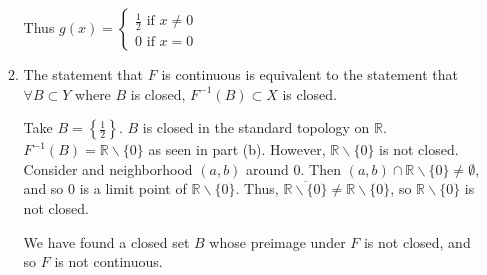 \documentclass{article}
\newcommand{\R}{\mathbb{R}}
\newcommand{\sk}{\smallskip}
\begin{document}
\begin{enumerate}
\begin{enumerate}
        \sk 

        Thus $g(x) = \begin{cases}
            \frac{1}{2} \text{ if } x \neq 0 \\
            0 \text{ if } x = 0
        \end{cases}$

        \item The statement that $F$ is continuous is equivalent to the statement that $\forall B \subset Y$ where $B$ is closed, $F^{-1}(B) \subset X$ is closed. 

        \sk 

        Take $B = \left\{\frac{1}{2}\right\}$. $B$ is closed in the standard topology on $\R$. $F^{-1}(B) = \R\backslash\{0\}$ as seen in part (b). However, $\R\backslash\{0\}$ is not closed. Consider and neighborhood $(a, b)$ around $0$. Then $(a, b) \cap \R\backslash\{0\} \neq \emptyset$, and so $0$ is a limit point of $\R\backslash\{0\}$. Thus, $\overline{\R\backslash\{0\}} \neq \R\backslash\{0\}$, so $\R\backslash\{0\}$ is not closed. 

        \sk

        We have found a closed set $B$ whose preimage under $F$ is not closed, and so $F$ is not continuous. 
    \end{enumerate}
\end{enumerate}
\end{document}
